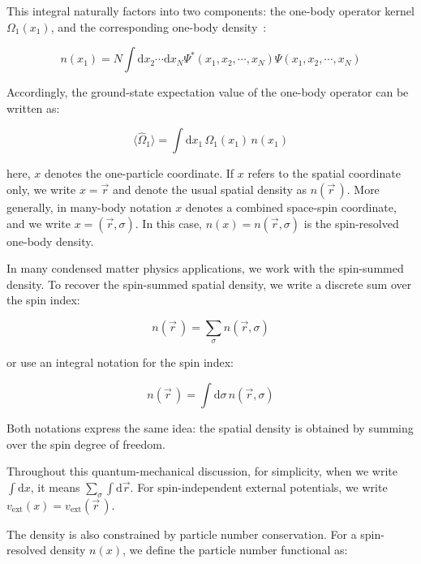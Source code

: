 This integral naturally factors into two components: the one-body operator kernel $\Omega_1(x_1)$,
and the corresponding one-body density~\cite{engel2011density,mazziotti2012two}:

\begin{equation}
    n(x_1)=N\int\mathrm{d}x_2\cdots\mathrm{d}x_N\Psi^*(x_1,x_2,\cdots,x_N)\Psi(x_1,x_2,\cdots,x_N)
\label{one-body_density}
\end{equation}

Accordingly, the ground-state expectation value of the one-body operator can be written as:

\begin{equation}
\langle\hat{\Omega}_1\rangle=\int\mathrm{d}x_1\,\Omega_1(x_1)\,n(x_1)
\label{expectation_one_body_operator}
\end{equation}

here, $x$ denotes the one-particle coordinate.
If $x$ refers to the spatial coordinate only, we write $x=\vec{r}$ and denote the usual spatial density as $n(\vec{r}\,)$.
More generally, in many-body notation $x$ denotes a combined space-spin coordinate, and we write $x=(\vec{r},\sigma)$.
In this case, $n(x)=n(\vec{r},\sigma)$ is the spin-resolved one-body density.

In many condensed matter physics applications, we work with the spin-summed density.
To recover the spin-summed spatial density, we write a discrete sum over the spin index:

\begin{equation}
    n(\vec{r}\,)=\sum_{\sigma} n(\vec{r},\sigma)
\label{sum_spatial_density}
\end{equation}

or use an integral notation for the spin index:

\begin{equation}
    n(\vec{r}\,)=\int\mathrm{d}\sigma\,n(\vec{r},\sigma)
\label{integral_spatial_density}
\end{equation}

Both notations express the same idea: the spatial density is obtained by summing over the spin degree of freedom.


Throughout this quantum-mechanical discussion, for simplicity, when we write $\int\mathrm{d}x$, it means $\sum_{\sigma}\int\mathrm{d}\vec{r}$.
For spin-independent external potentials, we write $v_\mathrm{ext}(x)=v_\mathrm{ext}(\vec{r}\,)$.

The density is also constrained by particle number conservation.
For a spin-resolved density $n(x)$, we define the particle number functional as:

